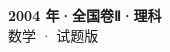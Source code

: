 \documentclass[zihao=-4, a4paper]{ctexart}
\begin{document}
\begin{center}
  {\Large\bfseries 2004 年·全国卷Ⅱ·理科}\\[4pt]
  {\large 数学 · 试题版}
\end{center}
\medskip
{}

\end{document}
